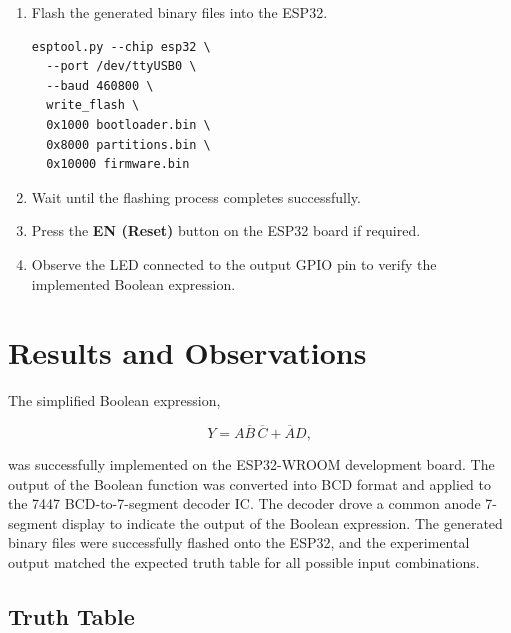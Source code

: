 \documentclass[12pt,a4paper]{article}
\begin{document}
\begin{enumerate}
\begin{verbatim}
esptool.py --chip esp32 --port /dev/ttyUSB0 chip_id
\end{verbatim}

\item Flash the generated binary files into the ESP32.

\begin{verbatim}
esptool.py --chip esp32 \
  --port /dev/ttyUSB0 \
  --baud 460800 \
  write_flash \
  0x1000 bootloader.bin \
  0x8000 partitions.bin \
  0x10000 firmware.bin
\end{verbatim}

\item Wait until the flashing process completes successfully.

\item Press the \textbf{EN (Reset)} button on the ESP32 board if required.

\item Observe the LED connected to the output GPIO pin to verify the implemented Boolean expression.

\end{enumerate}
\section*{Results and Observations}

The simplified Boolean expression,

$$
Y=A\overline{B}\,\overline{C}+\overline{A}D,
$$

was successfully implemented on the ESP32-WROOM development board. The output of the Boolean function was converted into BCD format and applied to the 7447 BCD-to-7-segment decoder IC. The decoder drove a common anode 7-segment display to indicate the output of the Boolean expression. The generated binary files were successfully flashed onto the ESP32, and the experimental output matched the expected truth table for all possible input combinations.

\subsection*{Truth Table}
\end{document}

